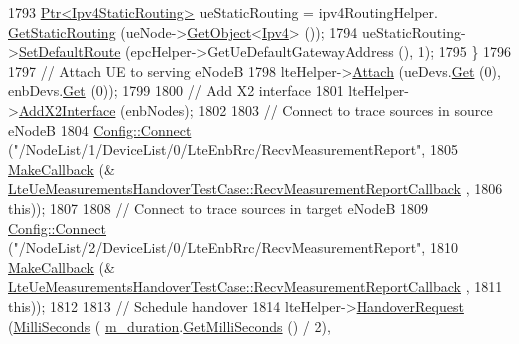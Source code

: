 \begin{DoxyCode}
1793       \hyperlink{classns3_1_1Ptr}{Ptr<Ipv4StaticRouting>} ueStaticRouting = ipv4RoutingHelper.
      \hyperlink{classns3_1_1Ipv4StaticRoutingHelper_a731206e50d305695dac7fb2ef963a4bb}{GetStaticRouting} (ueNode->\hyperlink{classns3_1_1Object_a13e18c00017096c8381eb651d5bd0783}{GetObject}<\hyperlink{classns3_1_1Ipv4}{Ipv4}> ());
1794       ueStaticRouting->\hyperlink{classns3_1_1Ipv4StaticRouting_aee30fa3246c2b42f122dabdff2725331}{SetDefaultRoute} (epcHelper->GetUeDefaultGatewayAddress (), 1);
1795     \}
1796 
1797   \textcolor{comment}{// Attach UE to serving eNodeB}
1798   lteHelper->\hyperlink{classns3_1_1LteHelper_a9466743f826aa2652a87907b7f0a1c87}{Attach} (ueDevs.\hyperlink{classns3_1_1NetDeviceContainer_a677d62594b5c9d2dea155cc5045f4d0b}{Get} (0), enbDevs.\hyperlink{classns3_1_1NetDeviceContainer_a677d62594b5c9d2dea155cc5045f4d0b}{Get} (0));
1799 
1800   \textcolor{comment}{// Add X2 interface}
1801   lteHelper->\hyperlink{classns3_1_1LteHelper_adbbd435f439200097e88a2965668bc26}{AddX2Interface} (enbNodes);
1802 
1803   \textcolor{comment}{// Connect to trace sources in source eNodeB}
1804   \hyperlink{group__config_ga4014f151241cd0939b6cb64409605736}{Config::Connect} (\textcolor{stringliteral}{"/NodeList/1/DeviceList/0/LteEnbRrc/RecvMeasurementReport"},
1805                    \hyperlink{group__makecallbackmemptr_ga9376283685aa99d204048d6a4b7610a4}{MakeCallback} (&
      \hyperlink{classLteUeMeasurementsHandoverTestCase_a84e6c207fcc76d63315df0b84660a9b5}{LteUeMeasurementsHandoverTestCase::RecvMeasurementReportCallback}
      ,
1806                                  \textcolor{keyword}{this}));
1807 
1808   \textcolor{comment}{// Connect to trace sources in target eNodeB}
1809   \hyperlink{group__config_ga4014f151241cd0939b6cb64409605736}{Config::Connect} (\textcolor{stringliteral}{"/NodeList/2/DeviceList/0/LteEnbRrc/RecvMeasurementReport"},
1810                    \hyperlink{group__makecallbackmemptr_ga9376283685aa99d204048d6a4b7610a4}{MakeCallback} (&
      \hyperlink{classLteUeMeasurementsHandoverTestCase_a84e6c207fcc76d63315df0b84660a9b5}{LteUeMeasurementsHandoverTestCase::RecvMeasurementReportCallback}
      ,
1811                                  \textcolor{keyword}{this}));
1812 
1813   \textcolor{comment}{// Schedule handover}
1814   lteHelper->\hyperlink{classns3_1_1LteHelper_a5b612c3b8d529e68b848cdca95838087}{HandoverRequest} (\hyperlink{group__timecivil_gaf26127cf4571146b83a92ee18679c7a9}{MilliSeconds} (
      \hyperlink{classLteUeMeasurementsHandoverTestCase_a938131aebb85de0834fc408341950156}{m\_duration}.\hyperlink{classns3_1_1Time_aba3428a8b6c4c8d9014ce44145081f34}{GetMilliSeconds} () / 2),

\end{DoxyCode}

